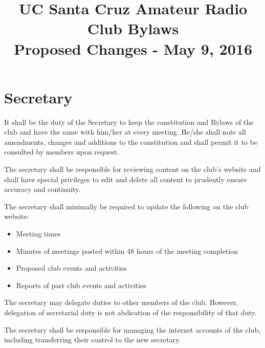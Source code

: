 \documentclass{article}
\begin{document}
\title{UC Santa Cruz Amateur Radio Club Bylaws \\ \small{Proposed Changes - May 9, 2016}}
\author{}
\date{}
\maketitle

\tableofcontents

\pagebreak

\section{Secretary}
\begin{itemize}
\item It shall be the duty of the Secretary to keep the constitution and Bylaws of the club and have the same with him/her at every meeting. He/she shall note all amendments, changes and additions to the constitution and shall permit it to be consulted by members upon request.

\item The secretary shall be responsible for reviewing content on the club's website and shall have special privileges to edit and delete all content to prudently ensure accuracy and continuity. 

{\color{blue} 
\item The secretary shall minimally be required to update the following on the club website:

\begin{itemize}
\item Meeting times
\item Minutes of meetings posted within 48 hours of the meeting completion
\item Proposed club events and activities 
\item Reports of past club events and activities
\end{itemize}
}

{\color{blue} 
\item The secretary may delegate duties to other members of the club. However, delegation of secretarial duty is not abdication of the responsibility of that duty.  
}

{\color{blue}
\item The secretary shall be responsible for managing the internet accounts of the club, including transferring their control to the new secretary.
}

\end{itemize}
\end{document}
